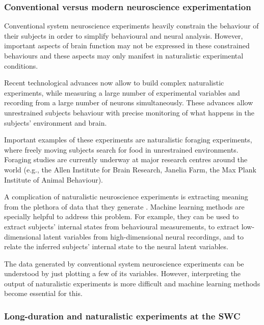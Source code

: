 \subsubsection*{Conventional versus modern neuroscience experimentation}

Conventional system neuroscience experiments heavily constrain the behaviour of
their subjects in order to simplify behavioural and neural analysis.  However,
important aspects of brain function may not be expressed in these constrained
behaviours and these aspects may only manifest in naturalistic experimental
conditions.


Recent technological advances now allow to build complex naturalistic
experiments, while measuring a large number of experimental variables and
recording from a large number of neurons simultaneously. These advances
allow unrestrained subjects behaviour with precise monitoring of what happens in
the subjects' environment and brain.

Important examples of these experiments are naturalistic foraging experiments,
where freely moving subjects search for food in unrestrained environments.
Foraging studies are currently underway at major research centres around the
world (e.g., the Allen Institute for Brain Research, Janelia Farm, the Max
Plank Institute of Animal Behaviour).

A complication of naturalistic neuroscience experiments is extracting meaning
from the plethora of data that they generate \citep{juavinett22}. Machine learning methods are
specially helpful to address this problem. For example, they can be used to
extract subjects' internal states from behavioural measurements, to extract
low-dimensional latent variables from high-dimensional neural recordings, and
to relate the inferred subjects' internal state to the neural latent variables.

The data generated by conventional system neuroscience experiments can be
understood by just plotting a few of its variables. However, interpreting the output
of naturalistic experiments is more difficult and machine learning methods
become essential for this.

\subsubsection*{Long-duration and naturalistic experiments at the SWC}

